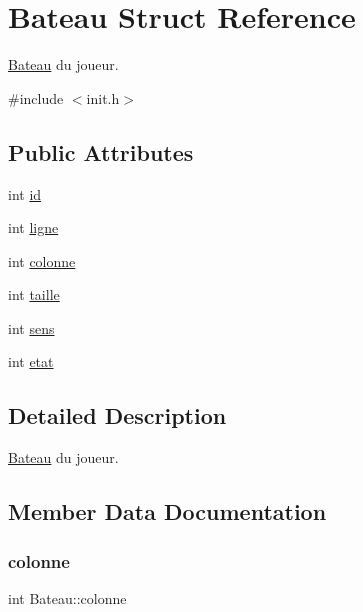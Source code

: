 \hypertarget{structBateau}{}\section{Bateau Struct Reference}
\label{structBateau}


\hyperlink{structBateau}{Bateau} du joueur.  




{\ttfamily \#include $<$init.\+h$>$}

\subsection*{Public Attributes}
\begin{DoxyCompactItemize}
\item 
int \hyperlink{structBateau_afc8b5863d722d86e00511dcae976220d}{id}
\item 
int \hyperlink{structBateau_ae8d7a76573b9e27c1e72a15832b9d6f3}{ligne}
\item 
int \hyperlink{structBateau_abbe487a77be892bdf087c1b146c957d6}{colonne}
\item 
int \hyperlink{structBateau_a1dd818ea44eed67f756400eaac344a95}{taille}
\item 
int \hyperlink{structBateau_a887a8ad2ee59ffd987eb5f9d117e83a2}{sens}
\item 
int \hyperlink{structBateau_a43f12f415c28f4dbd4f28808b9fc1e51}{etat}
\end{DoxyCompactItemize}


\subsection{Detailed Description}
\hyperlink{structBateau}{Bateau} du joueur. 

\subsection{Member Data Documentation}
\hypertarget{structBateau_abbe487a77be892bdf087c1b146c957d6}{}\label{structBateau_abbe487a77be892bdf087c1b146c957d6} 
\subsubsection{\texorpdfstring{colonne}{colonne}}
{\footnotesize\ttfamily int Bateau\+::colonne}

\hypertarget{structBateau_a43f12f415c28f4dbd4f28808b9fc1e51}{}\label{structBateau_a43f12f415c28f4dbd4f28808b9fc1e51} 
